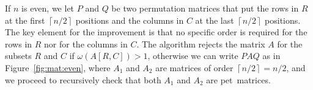 \documentclass[a4paper,10pt]{llncs}
\newcommand{\PET}{pet}
\begin{document}
\begin{figure}[!t]
    \centering
    \qquad
    \qquad
    \caption{\label{fig:matrices 1 and 2}}
\end{figure}
If $n$ is even, we let $P$ and $Q$ be two permutation matrices that put the rows in $R$
at the first $\left\lceil n/2 \right\rceil$ positions and the columns in $C$ 
at the last $\left\lceil n/2 \right\rceil$ positions.
The key element for the improvement
is that no specific order is required 
for the rows in $R$ nor for the columns in $C$.
The algorithm rejects the matrix $A$ for the subsets $R$ and $C$ 
if $\omega(A[R, C]) > 1$, otherwise we can write $PAQ$ as in
Figure~\ref{fig:mat:even},
where $A_1$ and $A_2$ are matrices of order $\left\lceil n/2 \right\rceil = n/2$,
and we proceed to recursively check that
both $A_1$ and $A_2$ are \PET\  matrices.
\end{document}
